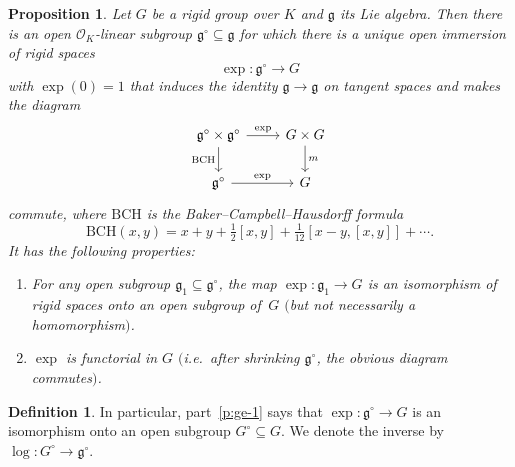 \documentclass[10pt,a4paper]{article}
\newtheorem{Proposition}[thm]{Proposition}
\theoremstyle{definition}
\newtheorem{Definition}[thm]{Definition}
\theoremstyle{remark}
\newcommand{\lra}{\longrightarrow}
\renewcommand{\O}{\mathcal{O}}
\newcommand{\mg}{\mathfrak{g}}
\numberwithin{equation}{section}
\begin{document}
\begin{Proposition}\label{p:general-exponential}
	Let $G$ be a rigid group over $K$ and $\mathfrak g$ its Lie algebra. Then there is an open $\O_K$-linear subgroup $\mathfrak g^{\circ}\subseteq \mathfrak g$ for which there is a unique open immersion of rigid spaces
	\[ \exp\colon\mathfrak g^{\circ}\lra G\]
	with $\exp(0)=1$ that induces the identity $\mathfrak g\to \mathfrak g$ on tangent spaces and makes the diagram
	\[\begin{tikzcd}
		\mathfrak g^{\circ}\times \mathfrak g^{\circ} \arrow[d, "\mathrm{BCH}"'] \arrow[r, "\exp"] & G\times G \arrow[d, "m"] \\
		\mathfrak g^{\circ} \arrow[r, "\exp"] & G
	\end{tikzcd}\]
	commute,
	where $\mathrm{BCH}$ is the Baker--Campbell--Hausdorff formula \[\mathrm{BCH}(x,y)=x+y+\tfrac{1}{2}[x,y]+\tfrac{1}{12}[x-y,[x,y]]+\cdots.\]
        It has the following properties:
	\begin{enumerate}
		\item\label{p:ge-1} For any open subgroup $\mathfrak g_1\subseteq \mathfrak g^{\circ}$, the map $\exp\colon \mathfrak g_1\to G$ is an isomorphism of rigid spaces onto an open subgroup of\, $G$ $($but not necessarily a homomorphism$)$.
		\item\label{p:ge-2} 
	 $\exp$ is functorial in $G$ $($i.e.\ after shrinking $\mg^{\circ}$, the obvious diagram commutes$)$.
	\end{enumerate}
\end{Proposition}

\begin{Definition}
	In particular, part~\eqref{p:ge-1} says that $\exp\colon \mg^\circ\to G$ is an isomorphism onto an open subgroup $G^\circ\subseteq G$. We denote the inverse by $\log\colon G^\circ\to \mg^\circ$.
\end{Definition}
\end{document}
